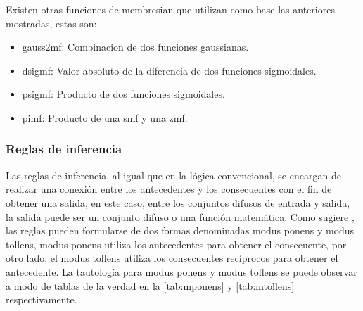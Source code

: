             Existen otras funciones de membresian que utilizan como base las anteriores mostradas, estas son:

            \begin{itemize}[leftmargin=\parindent]
                \item gauss2mf: Combinacion de dos funciones gaussianas.
                \item dsigmf: Valor absoluto de la diferencia de dos funciones sigmoidales.
                \item psigmf: Producto de dos funciones sigmoidales.
                \item pimf: Producto de una smf y una zmf.
            \end{itemize}
        
        \subsubsection{Reglas de inferencia}
            
            Las reglas de inferencia, al igual que en la lógica convencional, se encargan de realizar una conexión entre los antecedentes y los consecuentes con el fin de obtener una salida, en este caso, entre los conjuntos difusos de entrada y salida, la salida puede ser un conjunto difuso o una función matemática. Como sugiere \textcite{cruz2010inteligencia}, las reglas pueden formularse de dos formas denominadas modus ponens y modus tollens, modus ponens utiliza los antecedentes para obtener el consecuente, por otro lado, el modus tollens utiliza los consecuentes recíprocos para obtener el antecedente. La tautología para modus ponens y modus tollens se puede observar a modo de tablas de la verdad en la \cref{tab:mponens} y \cref{tab:mtollens} respectivamente.
            

